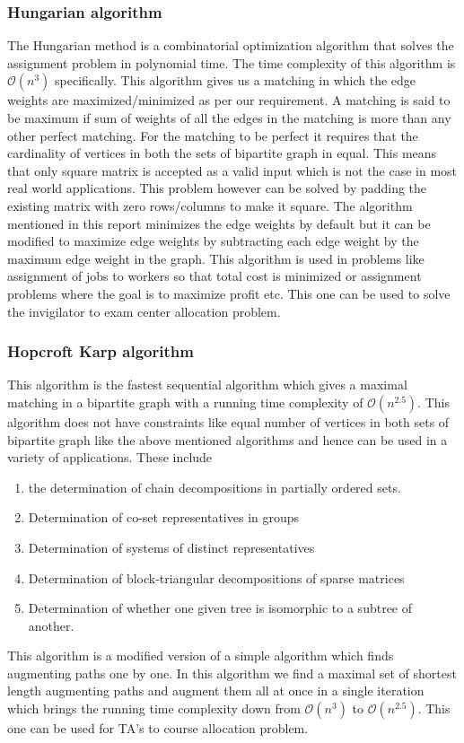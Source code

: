 \documentclass[a4paper]{report}
\theoremstyle{definition}
\begin{document}
\subsubsection{Hungarian algorithm} 

The Hungarian method is a combinatorial optimization algorithm that solves the assignment problem in polynomial time. The time complexity of this algorithm is $\mathcal{O}(n^3)$ specifically. This algorithm gives us a matching in which the edge weights are maximized/minimized as per our requirement. A matching is said to be maximum if sum of weights of all the edges in the matching is more than any other perfect matching. For the matching to be perfect it requires that the cardinality of vertices in both the sets of bipartite graph in equal. This means that only square matrix is accepted as a valid input which is not the case in most real world applications. This problem however can be solved by padding the existing matrix with zero rows/columns to make it square. The algorithm mentioned in this report minimizes the edge weights by default but it can be modified to maximize edge weights by subtracting each edge weight by the maximum edge weight in the graph. This algorithm is used in problems like assignment of jobs to workers so that total cost is minimized or assignment problems where the goal is to maximize profit etc. This one can be used to solve the invigilator to exam center allocation problem.
\subsubsection{Hopcroft Karp algorithm} 

This algorithm is the fastest sequential algorithm which gives a maximal matching in a bipartite graph with a running time complexity of $\mathcal{O}(n^{2.5})$. This algorithm does not have constraints like equal number of vertices in both sets of bipartite graph like the above mentioned algorithms and hence can be used in a variety of applications. These include
\begin{enumerate}
\item the determination of chain decompositions in partially ordered sets.
\item Determination of co-set representatives in groups
\item Determination of systems of distinct representatives
\item Determination of block-triangular decompositions of sparse matrices
\item Determination of whether one given tree is isomorphic to a subtree of another.
\end{enumerate}
This algorithm is a modified version of a simple algorithm which finds augmenting paths one by one. In this algorithm we find a maximal set of shortest length augmenting paths and augment them all at once in a single iteration which brings the running time complexity down from $\mathcal{O}(n^3)$ to $\mathcal{O}(n^{2.5})$. This one can be used for TA's to course allocation problem.\\
\end{document}
